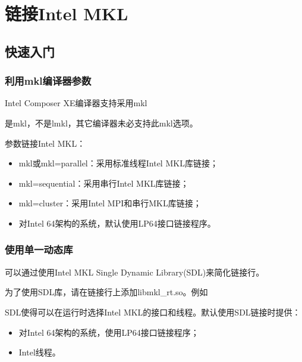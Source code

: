 \documentclass[a4paper,12pt,english]{sphinxmanual}
\begin{document}
\section{链接Intel MKL}
\label{\detokenize{intel-mkl/intel-mkl:id4}}

\subsection{快速入门}
\label{\detokenize{intel-mkl/intel-mkl:id5}}

\subsubsection{利用\sphinxhyphen{}mkl编译器参数}
\label{\detokenize{intel-mkl/intel-mkl:mkl}}
\sphinxAtStartPar
Intel Composer XE编译器支持采用\sphinxhyphen{}mkl %
\begin{footnote}[4]\sphinxAtStartFootnote
是\sphinxhyphen{}mkl，不是\sphinxhyphen{}lmkl，其它编译器未必支持此\sphinxhyphen{}mkl选项。
%
\end{footnote} 参数链接Intel MKL：
\begin{itemize}
\item {} 
\sphinxAtStartPar
\sphinxhyphen{}mkl或\sphinxhyphen{}mkl=parallel：采用标准线程Intel MKL库链接；

\item {} 
\sphinxAtStartPar
\sphinxhyphen{}mkl=sequential：采用串行Intel MKL库链接；

\item {} 
\sphinxAtStartPar
\sphinxhyphen{}mkl=cluster：采用Intel MPI和串行MKL库链接；

\item {} 
\sphinxAtStartPar
对Intel 64架构的系统，默认使用LP64接口链接程序。

\end{itemize}


\subsubsection{使用单一动态库}
\label{\detokenize{intel-mkl/intel-mkl:id7}}
\sphinxAtStartPar
可以通过使用Intel MKL Single Dynamic Library(SDL)来简化链接行。

\sphinxAtStartPar
为了使用SDL库，请在链接行上添加libmkl\_rt.so。例如

\sphinxAtStartPar
{}

\sphinxAtStartPar
SDL使得可以在运行时选择Intel MKL的接口和线程。默认使用SDL链接时提供：
\begin{itemize}
\item {} 
\sphinxAtStartPar
对Intel 64架构的系统，使用LP64接口链接程序；

\item {} 
\sphinxAtStartPar
Intel线程。

\end{itemize}
\end{document}
